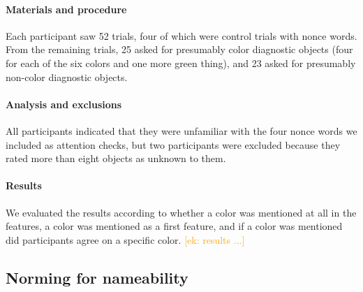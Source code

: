 \documentclass[a4paper,man,floatsintext,natbib,donotrepeattitle]{apa6}
\newcommand{\ek}[1]{\textcolor{Orange}{[ek: #1]}}
\begin{document}
\paragraph{Materials and procedure}
Each participant saw 52 trials, four of which were control trials with nonce words. From the remaining trials, 25 asked for presumably color diagnostic objects (four for each of the six colors and one more green thing), and 23 asked for presumably non-color diagnostic objects.

\paragraph{Analysis and exclusions}
All participants indicated that they were unfamiliar with the four nonce words we included as attention checks, but two participants were excluded because they rated more than eight objects as unknown to them.

\paragraph{Results}
We evaluated the results according to whether a color was mentioned at all in the features, a color was mentioned as a first feature, and if a color was mentioned did participants agree on a specific color.
\ek{results ...}


\subsection{Norming for nameability}
\label{nameabilitynorming}






\end{document}
